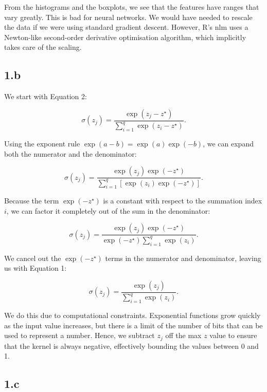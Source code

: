 \documentclass[12pt,halfline,a4paper,]{ouparticle}
\begin{document}
From the histograms and the boxplots, we see that the features have
ranges that vary greatly. This is bad for neural networks. We would have
needed to rescale the data if we were using standard gradient descent.
However, R's nlm uses a Newton-like second-order derivative optimisation
algorithm, which implicitly takes care of the scaling.

\subsection*{1.b}\label{b}

We start with Equation 2:

\[
\sigma(z_j) = \frac{\exp(z_j - z^\star)}{\sum_{i=1}^q \exp(z_i - z^\star)}.
\]

Using the exponent rule \(\exp(a - b) = \exp(a)\exp(-b)\), we can expand
both the numerator and the denominator:

\[
\sigma(z_j) = \frac{\exp(z_j)\exp(-z^\star)}{\sum_{i=1}^q [\exp(z_i)\exp(-z^\star)]}.
\]

Because the term \(\exp(-z^\star)\) is a constant with respect to the
summation index \(i\), we can factor it completely out of the sum in the
denominator:

\[
\sigma(z_j) = \frac{\exp(z_j)\exp(-z^\star)}{\exp(-z^\star) \sum_{i=1}^q \exp(z_i)}.
\]

We cancel out the \(\exp(-z^\star)\) terms in the numerator and
denominator, leaving us with Equation 1:

\[
\sigma(z_j) = \frac{\exp(z_j)}{\sum_{i=1}^q \exp(z_i)}.
\]

We do this due to computational constraints. Exponential functions grow
quickly as the input value increases, but there is a limit of the number
of bits that can be used to represent a number. Hence, we subtract
\(z_j\) off the max \(z\) value to ensure that the kernel is always
negative, effectively bounding the values between 0 and 1.

\subsection*{1.c}\label{c}
\end{document}
